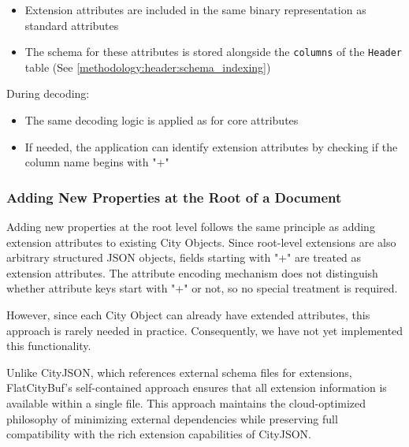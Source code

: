 \begin{itemize}
  \item Extension attributes are included in the same binary representation as standard attributes
  \item The schema for these attributes is stored alongside the \texttt{columns} of the \texttt{Header} table (See \autoref{methodology:header:schema_indexing})
\end{itemize}

During decoding:
\begin{itemize}
  \item The same decoding logic is applied as for core attributes
  \item If needed, the application can identify extension attributes by checking if the column name begins with "+"
\end{itemize}

\subsubsection{Adding New Properties at the Root of a Document}
\label{methodology:feature_encoding:extension_mechanism:adding_new_properties_at_the_root_of_a_document}

Adding new properties at the root level follows the same principle as adding extension attributes to existing City Objects. Since root-level extensions are also arbitrary structured JSON objects, fields starting with "+" are treated as extension attributes. The attribute encoding mechanism does not distinguish whether attribute keys start with "+" or not, so no special treatment is required.

However, since each City Object can already have extended attributes, this approach is rarely needed in practice. Consequently, we have not yet implemented this functionality.

Unlike CityJSON, which references external schema files for extensions, FlatCityBuf's self-contained approach ensures that all extension information is available within a single file. This approach maintains the cloud-optimized philosophy of minimizing external dependencies while preserving full compatibility with the rich extension capabilities of CityJSON.
